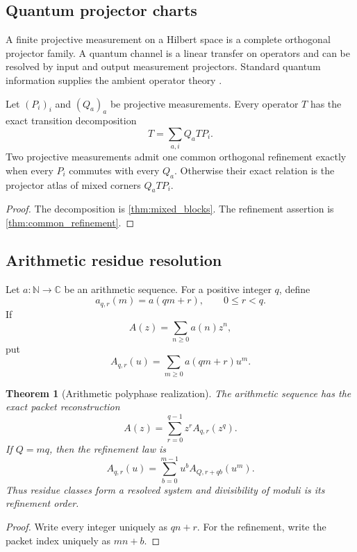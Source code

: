 \documentclass{aomart}
\newtheorem{theorem}{Theorem}[section]
\theoremstyle{definition}
\theoremstyle{remark}
\newcommand{\CC}{\mathbb C}
\newcommand{\NN}{\mathbb N}
\newcommand{\Rcite}[1]{\cite{#1}}
\begin{document}
\subsection{Quantum projector charts}

A finite projective measurement on a Hilbert space is a complete orthogonal projector family. A quantum channel is a linear transfer on operators and can be resolved by input and output measurement projectors. Standard quantum information supplies the ambient operator theory \Rcite{R19}.

\begin{proposition}\label{prop:quantum_realization}
Let \((P_i)_i\) and \((Q_a)_a\) be projective measurements. Every operator \(T\) has the exact transition decomposition
\[
 \boxed{
 T=\sum_{a,i}Q_aTP_i.
 }
\]
Two projective measurements admit one common orthogonal refinement exactly when every \(P_i\) commutes with every \(Q_a\). Otherwise their exact relation is the projector atlas of mixed corners \(Q_aTP_i\).
\end{proposition}

\begin{proof}
The decomposition is \cref{thm:mixed_blocks}. The refinement assertion is \cref{thm:common_refinement}.
\end{proof}

\subsection{Arithmetic residue resolution}

Let \(a:\NN\to\CC\) be an arithmetic sequence. For a positive integer \(q\), define
\[
 a_{q,r}(m)=a(qm+r),
 \qquad
 0\le r<q.
\]
If
\[
 A(z)=\sum_{n\ge0}a(n)z^n,
\]
put
\[
 A_{q,r}(u)=\sum_{m\ge0}a(qm+r)u^m.
\]

\begin{theorem}[Arithmetic polyphase realization]\label{thm:arithmetic_polyphase}
The arithmetic sequence has the exact packet reconstruction
\[
 \boxed{
 A(z)
 =
 \sum_{r=0}^{q-1}z^rA_{q,r}(z^q).
 }
\]
If \(Q=mq\), then the refinement law is
\[
 \boxed{
 A_{q,r}(u)
 =
 \sum_{b=0}^{m-1}
 u^bA_{Q,r+qb}(u^m).
 }
\]
Thus residue classes form a resolved system and divisibility of moduli is its refinement order.
\end{theorem}

\begin{proof}
Write every integer uniquely as \(qn+r\). For the refinement, write the packet index uniquely as \(mn+b\).
\end{proof}
\end{document}
